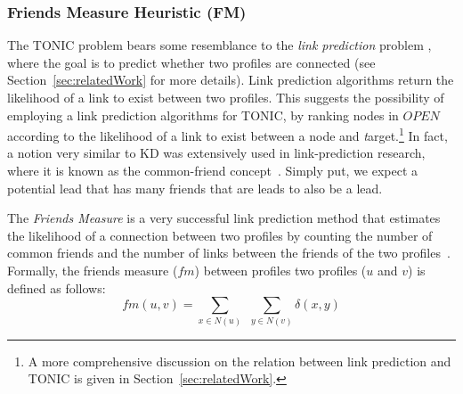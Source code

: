 \documentclass[journal]{IEEEtran}
\newcommand{\target}{{\textit target}}
\begin{document}



\subsubsection{Friends Measure Heuristic (FM)}
\label{sec:friendsMeasure}

The TONIC problem bears some resemblance to the \emph{link prediction} problem \cite{liben2007link}, where the goal is to predict whether two profiles are connected (see Section~\ref{sec:relatedWork} for more details). Link prediction algorithms return the likelihood of a link to exist between two profiles. This suggests the possibility of employing a link prediction algorithms for TONIC, by ranking nodes in $OPEN$ according to the likelihood of a link to exist between a node and \target .\footnote{A more comprehensive discussion on the relation between link prediction and TONIC is given in Section~\ref{sec:relatedWork}.} In fact, a notion very similar to KD was extensively used in link-prediction research, where it is known as the common-friend concept~\cite{liben2007link}. Simply put, we expect a potential lead that has many friends that are leads to also be a lead.


The \emph{Friends Measure} is a very successful link prediction method that estimates the likelihood of a connection between two profiles by counting the number of common friends and the number of links between the friends of the two profiles~\cite{fire2013linkPrediction}.
Formally, the friends measure ($fm$) between profiles two profiles ($u$ and $v$) is defined as follows:
\begin{equation}
fm(u,v)= \sum\limits_{x\in N(u)}~~\sum\limits_{y \in N(v)} \delta(x,y)
\end{equation}
\end{document}

